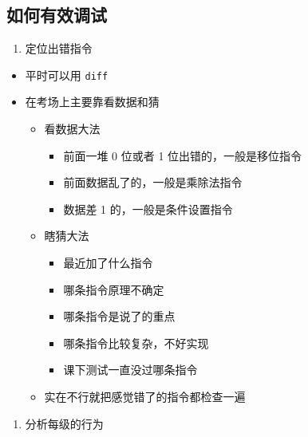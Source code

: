 \documentclass[12pt,AutoFakeBold,AutoFakeSlant]{article}
\providecommand{\tightlist}{%
  \setlength{\itemsep}{0pt}\setlength{\parskip}{0pt}}
\begin{document}
\hypertarget{ux5982ux4f55ux6709ux6548ux8c03ux8bd5}{%
\subsection{如何有效调试}\label{ux5982ux4f55ux6709ux6548ux8c03ux8bd5}}

\begin{enumerate}
\def\labelenumi{\arabic{enumi}.}
\tightlist
\item
  定位出错指令
\end{enumerate}

\begin{itemize}
\tightlist
\item
  平时可以用 \texttt{diff}
\item
  在考场上主要靠看数据和猜

  \begin{itemize}
  \tightlist
  \item
    看数据大法

    \begin{itemize}
    \tightlist
    \item
      前面一堆 0 位或者 1 位出错的，一般是移位指令
    \item
      前面数据乱了的，一般是乘除法指令
    \item
      数据差 1 的，一般是条件设置指令
    \end{itemize}
  \item
    瞎猜大法

    \begin{itemize}
    \tightlist
    \item
      最近加了什么指令
    \item
      哪条指令原理不确定
    \item
      哪条指令是说了的重点
    \item
      哪条指令比较复杂，不好实现
    \item
      课下测试一直没过哪条指令
    \end{itemize}
  \item
    实在不行就把感觉错了的指令都检查一遍
  \end{itemize}
\end{itemize}

\begin{enumerate}
\def\labelenumi{\arabic{enumi}.}
\setcounter{enumi}{1}
\tightlist
\item
  分析每级的行为
\end{enumerate}
\end{document}
